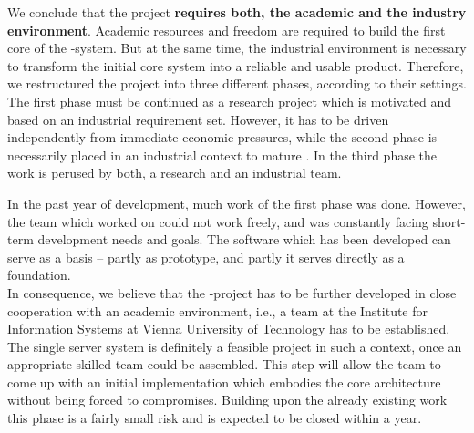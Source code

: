 \documentclass[a4paper, 10pt]{book}
\begin{document}
                                        We conclude that the \SYNEIGHT project \textbf{requires both, the academic
                                        and the industry environment}. Academic resources and freedom are
                                        required to build the first core of the \SYNEIGHT-system. But at the same
                                        time, the industrial environment is necessary to transform the initial
                                        core system into a reliable and usable product. Therefore, we
                                        restructured the project into three different phases, according to
                                        their settings. 
                                        The first phase must be continued as a research project which is
                                        motivated and based on an industrial requirement set.
                                        However, it has to be driven independently from immediate economic
                                        pressures, while the second phase is necessarily placed in an
                                        industrial context to mature \SYNEIGHT.  In the third phase the work is
                                        perused by both, a research and an industrial team.

                                        In the past year of development, much work of the first phase was
                                        done. However, the team which worked on \SYNEIGHT could not work freely,
                                        and was constantly facing short-term development needs and goals. 
                                        The software which has been developed can serve as a basis -- partly
                                        as prototype, and partly it serves directly as a foundation.\\
                                        In consequence, we believe that the \SYNEIGHT-project has to be further
                                        developed in close cooperation with an academic environment, i.e., a
                                        team at the Institute for Information Systems at Vienna University of
                                        Technology has to be established.
                                        The single server system is definitely a feasible project in such a
                                        context, once an appropriate skilled team could be assembled.
                                        This step will allow the team to come up with an initial
                                        implementation which embodies the core architecture without being
                                        forced to compromises.
                                        Building upon the already existing work this phase is a fairly small
                                        risk and is expected to be closed within a year.
\end{document}
